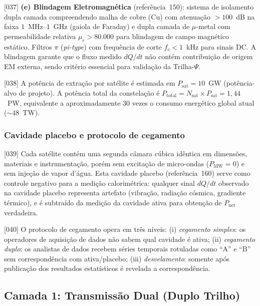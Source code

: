 \documentclass[12pt,a4paper]{article}
\newcommand{\Psifield}{\Psi}
\newcommand{\Pnet}{P_{\text{net}}}
\begin{document}
{[037]} \textbf{(e) Blindagem Eletromagnética} (referência~150): sistema de isolamento dupla camada compreendendo malha de cobre (Cu) com atenuação $> 100$~dB na faixa $1$~MHz--$1$~GHz (gaiola de Faraday) e dupla camada de $\mu$-metal com permeabilidade relativa $\mu_r > 80{.}000$ para blindagem de campo magnético estático. Filtros $\pi$ (\textit{pi-type}) com frequência de corte $f_c < 1$~kHz para sinais DC. A blindagem garante que o fluxo medido $dQ/dt$ não contém contribuição de origem EM externa, sendo critério essencial para validação da Trilha-$\Psifield$.

{[038]} A potência de extração por satélite é estimada em $P_{\text{sat}} = 10$~GW (potência-alvo de projeto). A potência total da constelação é $P_{\text{total}} = N_{\text{sat}} \times P_{\text{sat}} = 1{,}44$~PW, equivalente a aproximadamente $30$ vezes o consumo energético global atual ($\sim 48$~TW).

\subsubsection{Cavidade placebo e protocolo de cegamento}

{[039]} Cada satélite contém uma segunda câmara cúbica idêntica em dimensões, materiais e instrumentação, porém sem excitação de micro-ondas ($P_{\text{MW}} = 0$) e sem injeção de vapor d'água. Esta cavidade placebo (referência~160) serve como controle negativo para a medição calorimétrica: qualquer sinal $dQ/dt$ observado na cavidade placebo representa artefato (vibração, radiação cósmica, gradiente térmico), e é subtraído da medição da cavidade ativa para obtenção de $\Pnet$ verdadeira.

{[040]} O protocolo de cegamento opera em três níveis: (i) \textit{cegamento simples}: os operadores de aquisição de dados não sabem qual cavidade é ativa; (ii) \textit{cegamento duplo}: os analistas de dados recebem séries temporais rotuladas como ``A'' e ``B'' sem correspondência com ativa/placebo; (iii) \textit{desvelamento}: somente após publicação dos resultados estatísticos é revelada a correspondência.

\subsection{Camada 1: Transmissão Dual (Duplo Trilho)}
\label{sec:camada1}
\end{document}
